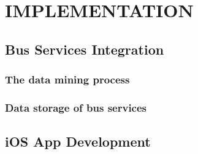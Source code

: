 %
%
\section{IMPLEMENTATION}

\subsection{Bus Services Integration}

\subsubsection{The data mining process}

\subsubsection{Data storage of bus services}

\subsection{iOS App Development}
